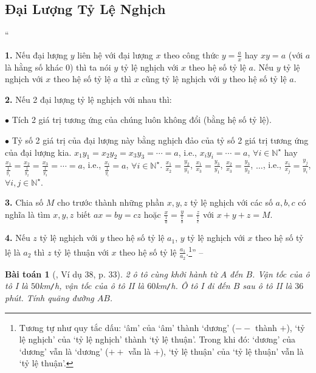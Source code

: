 \documentclass{article}
\numberwithin{equation}{section}
\newtheorem{baitoan}{Bài toán}
\begin{document}
\subsection{Đại Lượng Tỷ Lệ Nghịch}
``\begin{enumerate*}
	\item[\textbf{1.}] Nếu đại lượng $y$ liên hệ với đại lượng $x$ theo công thức $y = \frac{a}{x}$ hay $xy = a$ (với $a$ là hằng số khác $0$) thì ta nói $y$ tỷ lệ nghịch với $x$ theo hệ số tỷ lệ $a$. Nếu $y$ tỷ lệ nghịch với $x$ theo hệ số tỷ lệ $a$ thì $x$ cũng tỷ lệ nghịch với $y$ theo hệ số tỷ lệ $a$.
	\item[\textbf{2.}] Nếu 2 đại lượng tỷ lệ nghịch với nhau thì:
	\begin{enumerate*}
		\item[$\bullet$] Tích 2 giá trị tương ứng của chúng luôn không đổi (bằng hệ số tỷ lệ).
		\item[$\bullet$] Tỷ số 2 giá trị của đại lượng này bằng nghịch đảo của tỷ số 2 giá trị tương ứng của đại lượng kia. $x_1y_1 = x_2y_2 = x_3y_3 = \cdots = a$, i.e., $x_iy_i = \cdots = a$, $\forall i\in\mathbb{N}^\star$ hay $\frac{x_1}{\frac{1}{y_1}} = \frac{x_2}{\frac{1}{y_2}} = \frac{x_3}{\frac{1}{y_3}} = \cdots = a$, i.e., $\frac{x_i}{\frac{1}{y_i}} = a$, $\forall i\in\mathbb{N}^\star$. $\frac{x_1}{x_2} = \frac{y_2}{y_1}$, $\frac{x_1}{x_3} = \frac{y_3}{y_1}$, $\frac{x_2}{x_3} = \frac{y_3}{y_2}$, $\ldots$, i.e., $\frac{x_i}{x_j} = \frac{y_j}{y_i}$, $\forall i,j\in\mathbb{N}^\star$.
	\end{enumerate*}
	\item[\textbf{3.}] Chia số $M$ cho trước thành những phần $x,y,z$ tỷ lệ nghịch với các số $a,b,c$ có nghĩa là tìm $x,y,z$ biết $ax = by = cz$ hoặc $\frac{x}{\frac{1}{a}} = \frac{y}{\frac{1}{b}} = \frac{z}{\frac{1}{c}}$ với $x + y + z = M$.
	\item[\textbf{4.}] Nếu $z$ tỷ lệ nghịch với $y$ theo hệ số tỷ lệ $a_1$, $y$ tỷ lệ nghịch với $x$ theo hệ số tỷ lệ là $a_2$ thì $z$ tỷ lệ thuận với $x$ theo hệ số tỷ lệ $\frac{a_1}{a_2}$.\footnote{Tương tự như quy tắc dấu: `âm' của `âm' thành `dương' ($--$ thành $+$), `tỷ lệ nghịch' của `tỷ lệ nghịch' thành `tỷ lệ thuận'. Trong khi đó: `dương' của `dương' vẫn là `dương' ($++$ vẫn là $+$), `tỷ lệ thuận' của `tỷ lệ thuận' vẫn là `tỷ lệ thuận'.}'' -- \cite[Chap. 2, \S8, p. 33]{Tuyen_Toan_7}
\end{enumerate*}

\begin{baitoan}[\cite{Tuyen_Toan_7}, Ví dụ 38, p. 33]
	2 ô tô cùng khởi hành từ $A$ đến $B$. Vận tốc của ô tô I là $50$\emph{km\texttt{/}h}, vận tốc của ô tô II là $60$\emph{km\texttt{/}h}. Ô tô I đi đến $B$ sau ô tô II là $36$ phút. Tính quãng đường $AB$.
\end{baitoan}
\end{document}
